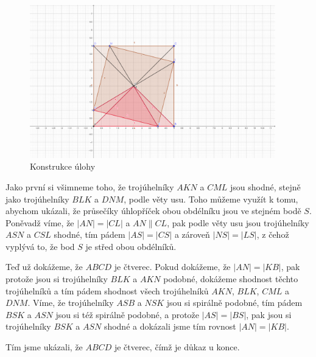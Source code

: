 \documentclass{fkssolpub}
\author{Ondřej Sedláček}
\begin{document}
\begin{figure}
	\begin{center}
		\includegraphics[width=0.95\textwidth]{2-fig}
	\end{center}
	\caption{Konstrukce úlohy}
	\label{fig:1}
\end{figure}

Jako první si všimneme toho, že trojúhelníky $AKN$ a $CML$ jsou shodné, stejně jako trojúhelníky $BLK$ a $DNM$, podle věty usu. Toho můžeme využít k tomu, abychom ukázali, že průsečíky úhlopříček obou obdélníku jsou ve stejném bodě $S$. Poněvadž víme, že $|AN| = |CL|$ a $AN \parallel CL$, pak podle věty usu jsou trojúhelníky $ASN$ a $CSL$ shodné, tím pádem $|AS| = |CS|$ a zároveň $|NS| = |LS|$, z čehož vyplývá to, že bod $S$ je střed obou obdélníků.

Teď už dokážeme, že $ABCD$ je čtverec. Pokud dokážeme, že $|AN| = |KB|$, pak protože jsou si trojúhelníky $BLK$ a $AKN$ podobné, dokážeme shodnost těchto trojúhelníků a tím pádem shodnost všech trojúhelníků $AKN$, $BLK$, $CML$ a $DNM$. Víme, že trojúhelníky $ASB$ a $NSK$ jsou si spirálně podobné, tím pádem $BSK$ a $ASN$ jsou si též spirálně podobné, a protože $|AS| = |BS|$, pak jsou si trojúhelníky $BSK$ a $ASN$ shodné a dokázali jsme tím rovnost $|AN| = |KB|$.

Tím jsme ukázali, že $ABCD$ je čtverec, čímž je důkaz u konce.
\end{document}

